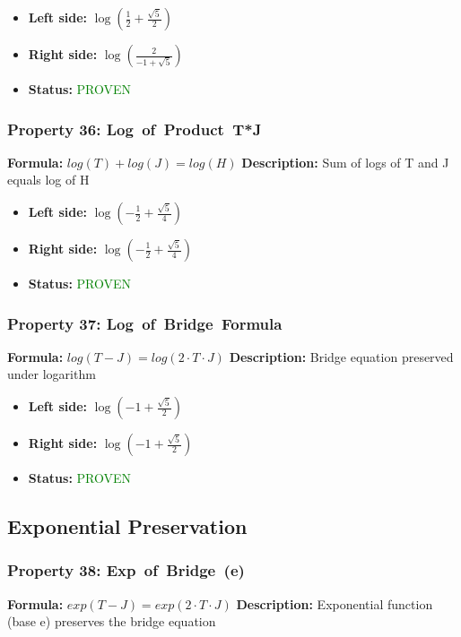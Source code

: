 \begin{itemize}
\item \textbf{Left side:} $\log{\left(\frac{1}{2} + \frac{\sqrt{5}}{2} \right)}$
\item \textbf{Right side:} $\log{\left(\frac{2}{-1 + \sqrt{5}} \right)}$
\item \textbf{Status:} \textcolor{green}{PROVEN}
\end{itemize}

\subsubsection*{Property 36: Log~of~Product~T*J}
\textbf{Formula:} $log(T) + log(J) = log(H)$
\textbf{Description:} Sum of logs of T and J equals log of H

\begin{itemize}
\item \textbf{Left side:} $\log{\left(- \frac{1}{2} + \frac{\sqrt{5}}{4} \right)}$
\item \textbf{Right side:} $\log{\left(- \frac{1}{2} + \frac{\sqrt{5}}{4} \right)}$
\item \textbf{Status:} \textcolor{green}{PROVEN}
\end{itemize}

\subsubsection*{Property 37: Log~of~Bridge~Formula}
\textbf{Formula:} $log(T-J) = log(2 \cdot T \cdot J)$
\textbf{Description:} Bridge equation preserved under logarithm

\begin{itemize}
\item \textbf{Left side:} $\log{\left(-1 + \frac{\sqrt{5}}{2} \right)}$
\item \textbf{Right side:} $\log{\left(-1 + \frac{\sqrt{5}}{2} \right)}$
\item \textbf{Status:} \textcolor{green}{PROVEN}
\end{itemize}


\subsection{Exponential Preservation}

\subsubsection*{Property 38: Exp~of~Bridge~(e)}
\textbf{Formula:} $exp(T-J) = exp(2 \cdot T \cdot J)$
\textbf{Description:} Exponential function (base e) preserves the bridge equation

